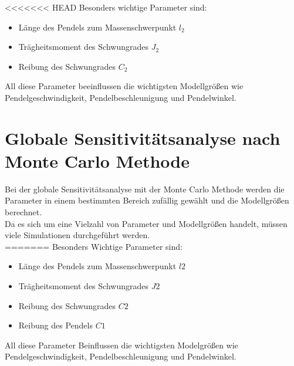 <<<<<<< HEAD
Besonders wichtige Parameter sind:
\begin{itemize}
    \item Länge des Pendels zum Massenschwerpunkt $l_2$
    \item Trägheitsmoment des Schwungrades $J_2$
    \item Reibung des Schwungrades $C_2$
\end{itemize}
All diese Parameter beeinflussen die wichtigsten Modellgrößen wie Pendelgeschwindigkeit, Pendelbeschleunigung und Pendelwinkel.\\

\section{Globale Sensitivitätsanalyse nach Monte Carlo Methode}
Bei der globale Sensitivitätsanalyse mit der Monte Carlo Methode werden die Parameter in einem bestimmten Bereich zufällig gewählt und die Modellgrößen berechnet.\\
Da es sich um eine Vielzahl von Parameter und Modellgrößen handelt, müssen viele Simulationen durchgeführt werden.\\
=======
Besonders Wichtige Parameter sind:
\begin{itemize}
    \item Länge des Pendels zum Massenschwerpunkt $l2$
    \item Trägheitsmoment des Schwungrades $J2$
    \item Reibung des Schwungrades $C2$
    \item  Reibung des Pendels $C1$
\end{itemize}
All diese Parameter Beinflussen die wichtigsten Modelgrößen wie Pendelgeschwindigkeit, Pendelbeschleunigung und Pendelwinkel.\\

